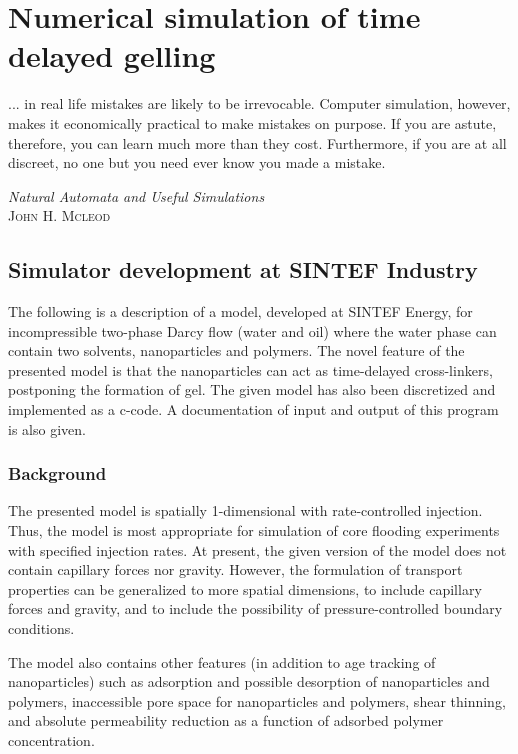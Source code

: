 \chapter{Numerical simulation of time delayed gelling } \label{chap:simulation}
\vspace*{\fill}
\epigraph{... in real life mistakes are likely to be irrevocable. Computer simulation, however, makes it economically practical to make mistakes on purpose. If you are astute, therefore, you can learn much more than they cost. Furthermore, if you are at all discreet, no one but you need ever know you made a mistake.}%
{\textit{Natural Automata and Useful Simulations}\\ \textsc{John H. Mcleod}}
\clearpage{\thispagestyle{empty}\cleardoublepage}
\section{Simulator development at SINTEF Industry}
The following is a description of a model, developed at SINTEF Energy, for incompressible two-phase Darcy flow (water and oil) where the water phase can contain two solvents, nanoparticles and polymers. The novel feature of the presented model is that the nanoparticles can act as time-delayed cross-linkers, postponing the formation of gel. The given model has also been discretized and implemented as a c-code. A documentation of input and output of this program is also given.

\subsection{Background}
The presented model is spatially 1-dimensional with rate-controlled injection. Thus, the model is most appropriate for simulation of core flooding experiments with specified injection rates. At present, the given version of the model does not contain capillary forces nor gravity. However, the formulation of transport properties can be generalized to more spatial dimensions, to include capillary forces and gravity, and to include the possibility of pressure-controlled boundary conditions. 

The model also contains other features (in addition to age tracking of nanoparticles) such as adsorption and possible desorption of nanoparticles and polymers, inaccessible pore space for nanoparticles and polymers, shear thinning, and absolute permeability reduction as a function of adsorbed polymer concentration. 

